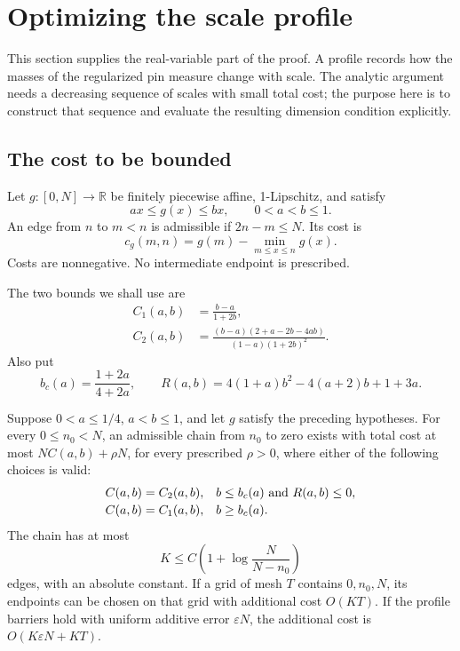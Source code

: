 \section{Optimizing the scale profile}
\label{humanprofile:section}

This section supplies the real-variable part of the proof. A profile records
how the masses of the regularized pin measure change with scale. The analytic
argument needs a decreasing sequence of scales with small total cost; the
purpose here is to construct that sequence and evaluate the resulting
dimension condition explicitly.

\subsection{The cost to be bounded}

Let \(g:[0,N]\to\mathbb R\) be finitely piecewise affine,
1-Lipschitz, and satisfy
\[
 ax\le g(x)\le bx,\qquad 0<a<b\le1.
\]
An edge from \(n\) to \(m<n\) is admissible if \(2n-m\le N\).
Its cost is
\begin{equation}\label{humanprofile:edge}
 c_g(m,n)=g(m)-\min_{m\le x\le n}g(x).
\end{equation}
Costs are nonnegative. No intermediate endpoint is prescribed.

The two bounds we shall use are
\begin{align}
 C_1(a,b)&=\frac{b-a}{1+2b},
       \label{humanprofile:C1}\\
 C_2(a,b)&=\frac{(b-a)(2+a-2b-4ab)}
                    {(1-a)(1+2b)^2}.
       \label{humanprofile:C2}
\end{align}
Also put
\begin{equation}\label{humanprofile:parameters}
 b_c(a)=\frac{1+2a}{4+2a},\qquad
 R(a,b)=4(1+a)b^2-4(a+2)b+1+3a.
\end{equation}

\begin{theorem}\label{humanprofile:bound}
Suppose \(0<a\le1/4\), \(a<b\le1\), and let \(g\) satisfy the
preceding hypotheses. For every \(0\le n_0<N\), an admissible
chain from \(n_0\) to zero exists with total cost at most
\(NC(a,b)+\rho N\), for every prescribed \(\rho>0\),
where either of the following choices is valid:
\[
 \begin{array}{ll}
 C(a,b)=C_2(a,b),
 & b\le b_c(a)\ \hbox{and}\ R(a,b)\le0,\\[2pt]
 C(a,b)=C_1(a,b),
 & b\ge b_c(a).
 \end{array}
\]
The chain has at most
\begin{equation}\label{humanprofile:length}
 K\le C\left(1+\log\frac{N}{N-n_0}\right)
\end{equation}
edges, with an absolute constant. If a grid of mesh \(T\) contains
\(0,n_0,N\), its endpoints can be chosen on that grid with additional
cost \(O(KT)\). If the profile barriers hold with uniform additive
error \(\varepsilon N\), the additional cost is
\(O(K\varepsilon N+KT)\).
\end{theorem}

